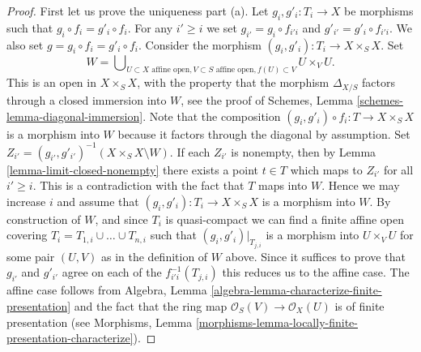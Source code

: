 \documentclass[10pt,a4paper]{amsart}
\theoremstyle{plain}
\theoremstyle{definition}
\theoremstyle{remark}
\numberwithin{equation}{subsection}
\begin{document}
\begin{proof}
\noindent
First let us prove the uniqueness part (a). Let $g_i, g'_i : T_i \to X$ be
morphisms such that $g_i \circ f_i = g'_i \circ f_i$. For any $i' \geq i$
we set $g_{i'} = g_i \circ f_{i'i}$ and $g'_{i'} = g'_i \circ f_{i'i}$.
We also set $g = g_i \circ f_i = g'_i \circ f_i$.
Consider the morphism
$(g_i, g'_i) : T_i \to X \times_S X$. Set
$$
W =
\bigcup\nolimits_{U \subset X\text{ affine open},
V \subset S\text{ affine open}, f(U) \subset V}
U \times_V U.
$$
This is an open in $X \times_S X$, with the property that the morphism
$\Delta_{X/S}$ factors through a closed immersion into $W$, see the proof
of Schemes, Lemma \ref{schemes-lemma-diagonal-immersion}.
Note that the composition
$(g_i, g'_i) \circ f_i : T \to X \times_S X$ is a morphism into $W$
because it factors through the diagonal by assumption.
Set $Z_{i'} = (g_{i'}, g'_{i'})^{-1}(X \times_S X \setminus W)$.
If each $Z_{i'}$ is nonempty, then by Lemma \ref{lemma-limit-closed-nonempty}
there exists a point $t \in T$ which maps to $Z_{i'}$ for all
$i' \geq i$. This is a contradiction with the fact that $T$ maps into $W$.
Hence we may increase $i$ and assume that $(g_i, g'_i) : T_i \to X \times_S X$
is a morphism into $W$. By construction of $W$, and since $T_i$ is
quasi-compact we can find a finite affine open covering
$T_i = T_{1, i} \cup \ldots \cup T_{n, i}$ such that
$(g_i, g'_i)|_{T_{j, i}}$ is a morphism into $U \times_V U$ for
some pair $(U, V)$ as in the definition of $W$ above.
Since it suffices to prove that $g_{i'}$ and $g'_{i'}$ agree
on each of the $f_{i'i}^{-1}(T_{j, i})$ this reduces us to the affine case.
The affine case follows from
Algebra, Lemma \ref{algebra-lemma-characterize-finite-presentation}
and the fact that the ring map
$\mathcal{O}_S(V) \to \mathcal{O}_X(U)$ is of finite presentation
(see Morphisms,
Lemma \ref{morphisms-lemma-locally-finite-presentation-characterize}).


\end{proof}
\end{document}
